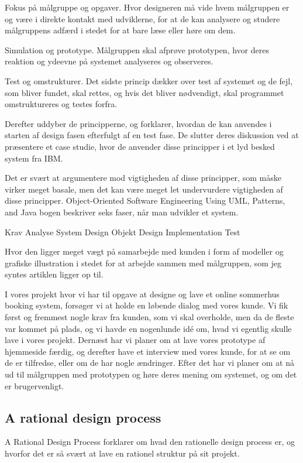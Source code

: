 \documentclass[12pt,a4paper]{article}
\begin{document}
Fokus på målgruppe og opgaver. 
Hvor designeren må vide hvem målgruppen er og være i direkte kontakt med udviklerne, for at de kan analysere og studere målgruppens adfærd i stedet for at bare læse eller høre om dem. 

Simulation og prototype.
Målgruppen skal afprøve prototypen, hvor deres reaktion og ydeevne på systemet analyseres og observeres.

Test og omstrukturer.
Det sidste princip dækker over test af systemet og de fejl, som bliver fundet, skal rettes, og hvis det bliver nødvendigt, skal programmet omstruktureres og testes forfra.

Derefter uddyber de principperne, og forklarer, hvordan de kan anvendes i starten af design fasen efterfulgt af en test fase. De slutter deres diskussion ved at præsentere et case studie, hvor de anvender disse principper i et lyd besked system fra IBM.   

Det er svært at argumentere mod vigtigheden af disse principper, som måske virker meget basale, men det kan være meget let undervurdere vigtigheden af disse principper. Object-Oriented Software Engineering Using UML, Patterns, and Java bogen beskriver seks faser, når man udvikler et system.

Krav
Analyse
System Design
Objekt Design
Implementation
Test

Hvor den ligger meget vægt på samarbejde med kunden i form af modeller og grafiske illustration i stedet for at arbejde sammen med målgruppen, som jeg syntes artiklen ligger op til.

I vores projekt hvor vi har til opgave at designe og lave et online sommerhus booking system, forsøger vi at holde en løbende dialog med vores kunde. Vi fik først og fremmest nogle krav fra kunden, som vi skal overholde, men da de fleste var kommet på plads, og vi havde en nogenlunde idé om, hvad vi egentlig skulle lave i vores projekt. Dernæst har vi planer om at lave vores prototype af hjemmeside færdig, og derefter have et interview med vores kunde, for at se om de er tilfredse, eller om de har nogle ændringer. Efter det har vi planer om at nå ud til målgruppen med prototypen og høre deres mening om systemet, og om det er brugervenligt.
\subsection{A rational design process}
A Rational Design Process forklarer om hvad den rationelle design process er, og hvorfor det er så svært at lave en rationel struktur på sit projekt.
\end{document}
